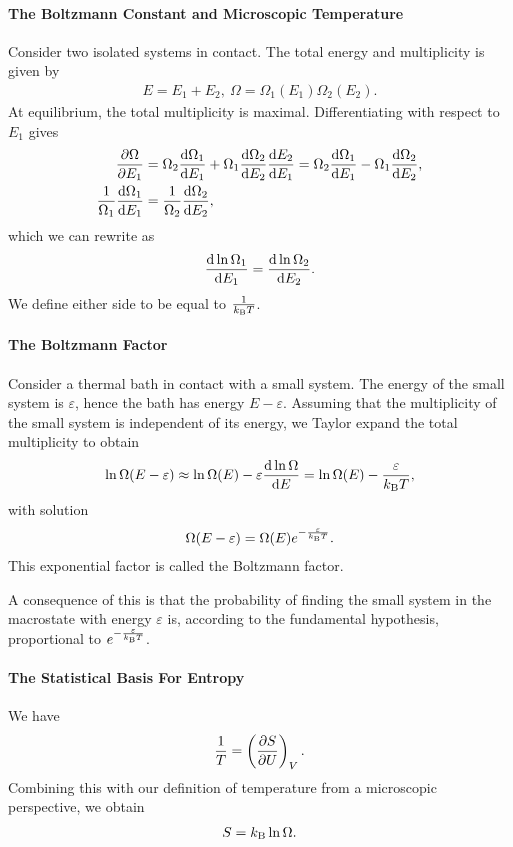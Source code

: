 \paragraph{The Boltzmann Constant and Microscopic Temperature}
Consider two isolated systems in contact. The total energy and multiplicity is given by
\begin{align*}
	E = E_{1} + E_{2},\ \Omega = \Omega_{1}(E_{1})\Omega_{2}(E_{2}).
\end{align*}
At equilibrium, the total multiplicity is maximal. Differentiating with respect to $E_{1}$ gives
\begin{align*}
	\pdv{\Omega}{E_{1}}                        &= \Omega_{2}\dv{\Omega_{1}}{E_{1}} + \Omega_{1}\dv{\Omega_{2}}{E_{2}}\dv{E_{2}}{E_{1}} = \Omega_{2}\dv{\Omega_{1}}{E_{1}} - \Omega_{1}\dv{\Omega_{2}}{E_{2}}, \\
	\frac{1}{\Omega_{1}}\dv{\Omega_{1}}{E_{1}} &= \frac{1}{\Omega_{2}}\dv{\Omega_{2}}{E_{2}},
\end{align*}
which we can rewrite as
\begin{align*}
	\dv{\ln{\Omega_{1}}}{E_{1}} = \dv{\ln{\Omega_{2}}}{E_{2}}.
\end{align*}
We define either side to be equal to $\frac{1}{k_{\text{B}} T}$.

\paragraph{The Boltzmann Factor}
Consider a thermal bath in contact with a small system. The energy of the small system is $\varepsilon$, hence the bath has energy $E - \varepsilon$. Assuming that the multiplicity of the small system is independent of its energy, we Taylor expand the total multiplicity to obtain
\begin{align*}
	\ln{\Omega(E - \varepsilon)} \approx \ln{\Omega(E)} - \varepsilon\dv{\ln{\Omega}}{E} = \ln{\Omega(E)} - \frac{\varepsilon}{k_{\text{B}} T},
\end{align*}
with solution
\begin{align*}
	\Omega(E - \varepsilon) = \Omega(E)e^{-\frac{\varepsilon}{k_{\text{B}} T}}.
\end{align*}
This exponential factor is called the Boltzmann factor.

A consequence of this is that the probability of finding the small system in the macrostate with energy $\varepsilon$ is, according to the fundamental hypothesis, proportional to $e^{-\frac{\varepsilon}{k_{\text{B}} T}}$.

\paragraph{The Statistical Basis For Entropy}
We have
\begin{align*}
	\frac{1}{T} = \left(\pdv{S}{U}\right)_{V}.
\end{align*}
Combining this with our definition of temperature from a microscopic perspective, we obtain
\begin{align*}
	S = k_{\text{B}}\ln{\Omega}.
\end{align*}

